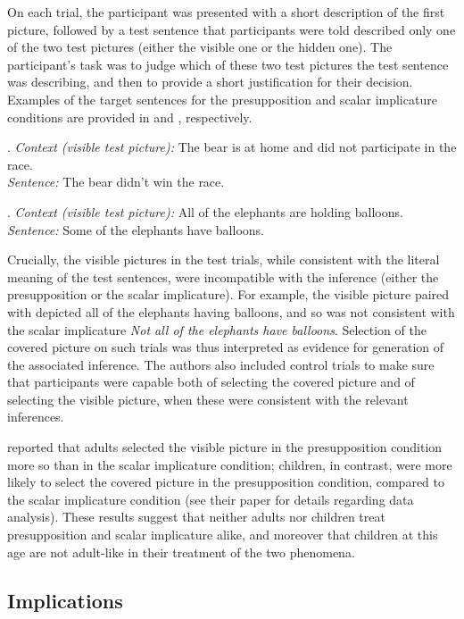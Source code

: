 \documentclass[12pt, letterpaper]{article}
\begin{document}
On each trial, the participant was presented with a short description of the first picture, followed by a test sentence that participants were told described only one of the two test pictures (either the visible one or the hidden one). The participant's task was to judge which of these two test pictures the test sentence was describing, and then to provide a short justification for their decision. Examples of the target sentences for the presupposition and scalar implicature conditions are provided in \Next and \NNext, respectively.

\ex. \textit{Context (visible test picture):} The bear is at home and did not participate in the race. \\
\textit{Sentence:} The bear didn't win the race.

\ex. \textit{Context (visible test picture):} All of the elephants are holding balloons. \\
\textit{Sentence:} Some of the elephants have balloons.

Crucially, the visible pictures in the test trials, while consistent with the literal meaning of the test sentences, were incompatible with the inference (either the presupposition or the scalar implicature). For example, the visible picture paired with \Last depicted all of the elephants having balloons, and so was not consistent with the scalar implicature \textit{Not all of the elephants have balloons}. Selection of the covered picture on such trials was thus interpreted as evidence for generation of the associated inference. The authors also included control trials to make sure that participants were capable both of selecting the covered picture and of selecting the visible picture, when these were consistent with the relevant inferences. 

\cite{Bill:2014b} reported that adults selected the visible picture in the presupposition condition more so than in the scalar implicature condition; children, in contrast, were more likely to select the covered picture in the presupposition condition, compared to the scalar implicature condition (see their paper for details regarding data analysis). These results suggest that neither adults nor children treat presupposition and scalar implicature alike, and moreover that children at this age are not adult-like in their treatment of the two phenomena. 

\subsection{Implications}
\end{document}
